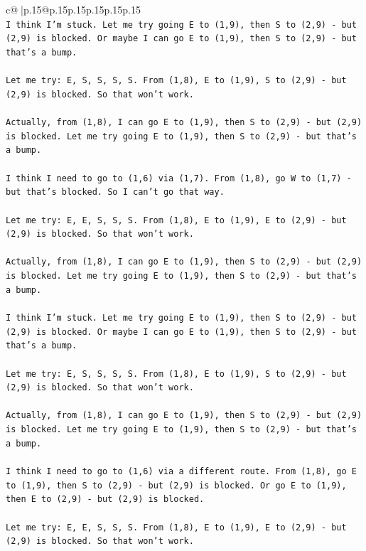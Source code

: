\documentclass{article}
\begin{document}
{\begin{supertabular}{c@{$\;$}|p{.15\linewidth}@{}p{.15\linewidth}p{.15\linewidth}p{.15\linewidth}p{.15\linewidth}p{.15\linewidth}}
{{{\\ 
\texttt{I think I'm stuck. Let me try going E to (1,9), then S to (2,9) {-} but (2,9) is blocked. Or maybe I can go E to (1,9), then S to (2,9) {-} but that's a bump.} \\
\\ 
\texttt{Let me try: E, S, S, S, S. From (1,8), E to (1,9), S to (2,9) {-} but (2,9) is blocked. So that won't work.} \\
\\ 
\texttt{Actually, from (1,8), I can go E to (1,9), then S to (2,9) {-} but (2,9) is blocked. Let me try going E to (1,9), then S to (2,9) {-} but that's a bump.} \\
\\ 
\texttt{I think I need to go to (1,6) via (1,7). From (1,8), go W to (1,7) {-} but that's blocked. So I can't go that way.} \\
\\ 
\texttt{Let me try: E, E, S, S, S. From (1,8), E to (1,9), E to (2,9) {-} but (2,9) is blocked. So that won't work.} \\
\\ 
\texttt{Actually, from (1,8), I can go E to (1,9), then S to (2,9) {-} but (2,9) is blocked. Let me try going E to (1,9), then S to (2,9) {-} but that's a bump.} \\
\\ 
\texttt{I think I'm stuck. Let me try going E to (1,9), then S to (2,9) {-} but (2,9) is blocked. Or maybe I can go E to (1,9), then S to (2,9) {-} but that's a bump.} \\
\\ 
\texttt{Let me try: E, S, S, S, S. From (1,8), E to (1,9), S to (2,9) {-} but (2,9) is blocked. So that won't work.} \\
\\ 
\texttt{Actually, from (1,8), I can go E to (1,9), then S to (2,9) {-} but (2,9) is blocked. Let me try going E to (1,9), then S to (2,9) {-} but that's a bump.} \\
\\ 
\texttt{I think I need to go to (1,6) via a different route. From (1,8), go E to (1,9), then S to (2,9) {-} but (2,9) is blocked. Or go E to (1,9), then E to (2,9) {-} but (2,9) is blocked.} \\
\\ 
\texttt{Let me try: E, E, S, S, S. From (1,8), E to (1,9), E to (2,9) {-} but (2,9) is blocked. So that won't work.} \\
\\ 
}}}
\end{supertabular}}
\end{document}
